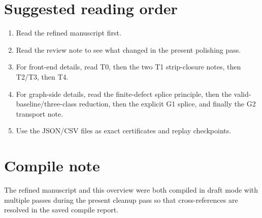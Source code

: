 \documentclass[11pt]{article}
\begin{document}
\section{Suggested reading order}

\begin{enumerate}[leftmargin=2.6em]
\item Read the refined manuscript first.
\item Read the review note to see what changed in the present polishing pass.
\item For front-end details, read T0, then the two T1 strip-closure notes,
      then T2/T3, then T4.
\item For graph-side details, read the finite-defect splice principle,
      then the valid-baseline/three-class reduction, then the explicit G1 splice,
      and finally the G2 transport note.
\item Use the JSON/CSV files as exact certificates and replay checkpoints.
\end{enumerate}

\section{Compile note}

The refined manuscript and this overview were both compiled in draft mode with
multiple passes during the present cleanup pass so that cross-references are
resolved in the saved compile report.
\end{document}
